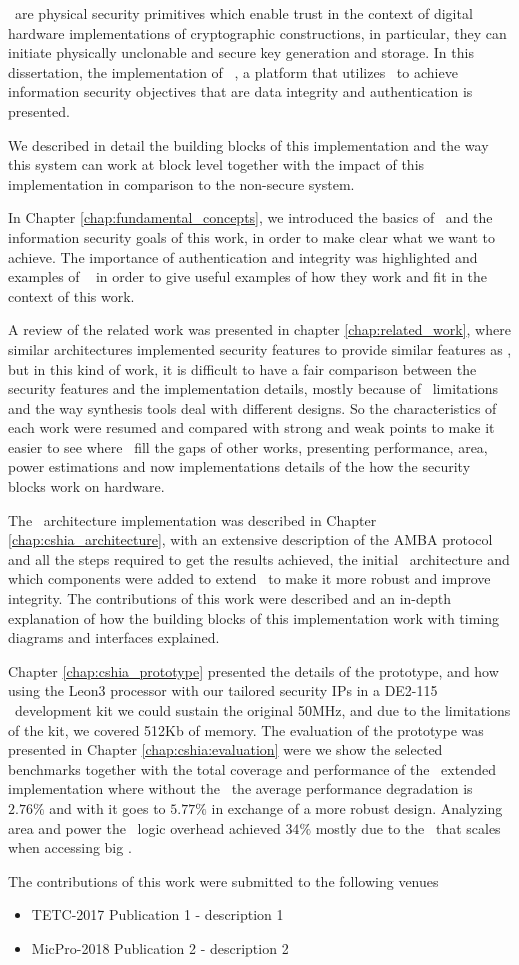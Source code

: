 \pufs~are physical security primitives which enable trust in the context of digital hardware implementations of cryptographic constructions, in particular, they can initiate physically unclonable and secure key generation and storage. In this dissertation, the implementation of \cshia~, a platform that utilizes \pufs~to achieve information security objectives that are data integrity and authentication is presented. 

We described in detail the building blocks of this implementation and the way this system can work at block level together with the impact of this implementation in comparison to the non-secure system.

In  Chapter \ref{chap:fundamental_concepts}, we introduced the basics of \pufs~and the information security goals of this work, in order to make clear what we want to achieve. The importance of authentication and integrity was highlighted and examples of \pufs~ in order to give useful examples of how they work and fit in the context of this work.

A review of the related work was presented in chapter \ref{chap:related_work}, where similar architectures implemented security features to provide similar features as \cshia, but in this kind of work, it is difficult to have a fair comparison  between  the security features and the implementation details, mostly because of \fpga~limitations and the way synthesis tools deal with different designs. So the characteristics of each work were resumed and compared with strong and weak points to make it easier to see where \cshia~fill the gaps of other works, presenting performance, area, power estimations and now implementations details of the how the security blocks work on hardware.

The \cshia~architecture implementation was described in Chapter \ref{chap:cshia_architecture}, with an extensive description of the AMBA protocol and all the steps required to get the results achieved, the initial \cshia~architecture and which components were added to extend \cshia~to make it more robust and improve integrity. The contributions of this work were described and an in-depth explanation of how the building blocks of this implementation work with timing diagrams and interfaces explained.


Chapter \ref{chap:cshia_prototype} presented the details of the prototype, and how using the Leon3 processor with our tailored security IPs in a DE2-115 \fpga~development kit we could sustain the original 50MHz, and due to the limitations of the kit, we covered 512Kb of memory. The evaluation of the prototype was presented in Chapter \ref{chap:cshia:evaluation}  were we show the selected benchmarks together with the total coverage and performance of the \cshia~extended implementation where without the \mt~the average  performance degradation is $2.76\%$ and with  it goes to $5.77\%$ in exchange of a more robust design. Analyzing area and power the \cshia~logic overhead achieved $34\%$ mostly due to the \sbuf~that scales when accessing big \slines.

  The contributions of this work were submitted to the following venues 
 \begin{itemize}
 \item{TETC-2017} Publication 1  - description 1
 \item{MicPro-2018} Publication 2 - description 2
 \end{itemize}